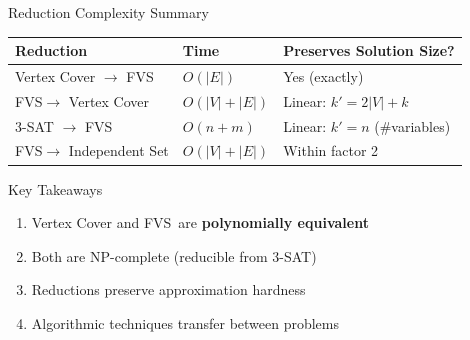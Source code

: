 \documentclass[aspectratio=169]{beamer}
\newcommand{\fvs}{\textsc{FVS}}
\newcommand{\np}{\textsc{NP}}
\begin{document}
\begin{frame}{Reduction Complexity Summary}
  \begin{table}
    \centering
    \small
    \begin{tabular}{@{}lll@{}}
      \toprule
      \textbf{Reduction} & \textbf{Time} & \textbf{Preserves Solution Size?} \\
      \midrule
	Vertex Cover $\rightarrow$ \fvs & $O(|E|)$ & Yes (exactly) \\
	\fvs $\rightarrow$ Vertex Cover & $O(|V|+|E|)$ & Linear: $k' = 2|V| + k$ \\
	3-SAT $\rightarrow$ \fvs & $O(n+m)$ & Linear: $k' = n$ (\#variables) \\
	\fvs $\rightarrow$ Independent Set & $O(|V|+|E|)$ & Within factor 2 \\
      \bottomrule
    \end{tabular}
  \end{table}
  
  \vspace{0.8cm}
  
  \begin{block}{Key Takeaways}
    \begin{enumerate}
      \item Vertex Cover and \fvs\ are \textbf{polynomially equivalent}
      \item Both are \np-complete (reducible from 3-SAT)
      \item Reductions preserve approximation hardness
      \item Algorithmic techniques transfer between problems
    \end{enumerate}
  \end{block}
\end{frame}
\end{document}
